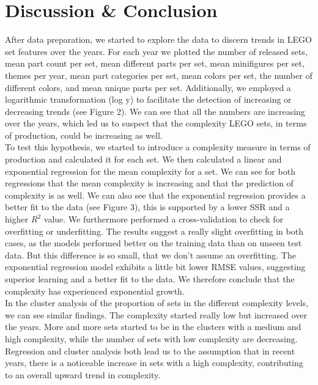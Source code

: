 \documentclass{article}
\theoremstyle{plain}
\theoremstyle{definition}
\theoremstyle{remark}
\begin{document}
\section{Discussion \& Conclusion}\label{sec:conclusion}

After data preparation, we started to explore the data to discern trends in LEGO set features over the years. For each year we plotted the number of released sets, mean part count per set, mean different parts per set, mean minifigures per set, themes per year, mean part categories per set, mean colors per set, the number of different colors, and mean unique parts per set. Additionally, we employed a logarithmic transformation (log y) to facilitate the detection of increasing or decreasing trends (see Figure 2). We can see that all the numbers are increasing over the years, which led us to suspect that the complexity LEGO sets, in terms of production, could be increasing as well. \\
To test this hypothesis, we started to introduce a complexity measure in terms of production and calculated it for each set. We then calculated a linear and exponential regression for the mean complexity for a set. We can see for both regressions that the mean complexity is increasing and that the prediction of complexity is as well. We can also see that the exponential regression provides a better fit to the data (see Figure 3), this is supported by a lower SSR and a higher $R^2$ value. We furthermore performed a cross-validation to check for overfitting or underfitting. The results suggest a really slight overfitting in both cases, as the models performed better on the training data than on unseen test data. But this difference is so small, that we don't assume an overfitting. The exponential regression model exhibits a little bit lower RMSE values, suggesting superior learning and a better fit to the data. We therefore conclude that the complexity has experienced exponential growth. \\
In the cluster analysis of the proportion of sets in the different complexity levels, we can see similar findings. The complexity started really low but increased over the years. More and more sets started to be in the clusters with a medium and high complexity, while the number of sets with low complexity are decreasing. 
Regression and cluster analysis both lead us to the assumption that in recent years, there is a noticeable increase in sets with a high complexity, contributing to an overall upward trend in complexity.\\
\end{document}

